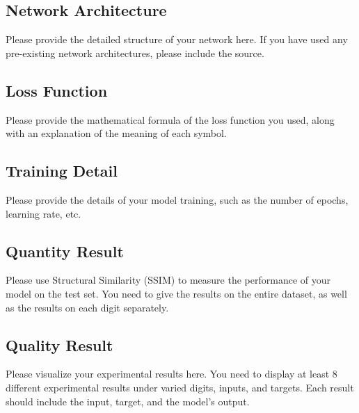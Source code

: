\documentclass{article}
\begin{document}
\subsection{Network Architecture}
Please provide the detailed structure of your network here. If you have used any pre-existing network architectures, please include the source.

\subsection{Loss Function}
Please provide the mathematical formula of the loss function you used, along with an explanation of the meaning of each symbol.

\subsection{Training Detail}
Please provide the details of your model training, such as the number of epochs, learning rate, etc.

\subsection{Quantity Result}
Please use Structural Similarity (SSIM) to measure the performance of your model on the test set. You need to give the results on the entire dataset, as well as the results on each digit separately.

\subsection{Quality Result}
Please visualize your experimental results here. You need to display at least 8 different experimental results under varied digits, inputs, and targets. Each result should include the input, target, and the model’s output.
\end{document}
